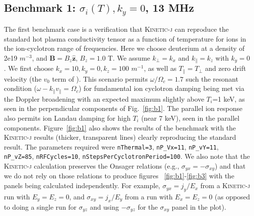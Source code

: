 \documentclass[final,5p,times,twocolumn]{elsarticle}
\let\oldhat\hat
\renewcommand{\vec}[1]{\mathbf{#1}}
\renewcommand{\hat}[1]{\oldhat{\mathbf{#1}}}
\newcommand{\kj}{\textsc{Kinetic-j}\xspace}
\begin{document}
\subsection{Benchmark 1: $\sigma_i\left(T\right), k_{y}=0$, 13 MHz}
\label{section:verification1}
%
The first benchmark case is a verification that \kj can reproduce the standard hot plasma conductivity tensor as a function of temperature for ions in the ion-cyclotron range of frequencies. Here we choose deuterium at a density of 2e19 $m^{-3}$, and $\vec{B}=B_z\hat{\vec{z}}$, $B_z=1.0$ T. We assume $k_\perp=k_x$ and $k_\parallel=k_z$ with $k_y=0$. We first choose $k_x=10,k_y=0,k_z=100$ $m^{-1}$, as well as $T_\parallel=T_\perp$ and zero drift velocity (the $v_0$ term of \cite{swanson}). This scenario permits $
\omega/\Omega_c=1.7$ such the resonant condition ($\omega-k_\parallel v_\parallel=\Omega_c$) for fundamental ion cyclotron damping being met via the Doppler broadening with an expected maximum slightly above $T_i$=1 keV, as seen in the perpendicular components of Fig.~\ref{fig:b1}. The parallel ion response also permits ion Landau damping for high $T_i$ (near 7 keV), seen in the parallel components. Figure~\ref{fig:b1} also shows the results of the benchmark with the \kj results (thicker, transparent lines) clearly reproducing the standard result. The parameters required were \texttt{nThermal=3}, \texttt{nP\_Vx=11}, \texttt{nP\_vY=11}, \texttt{nP\_vZ=85}, \texttt{nRFCycles=10}, \texttt{nStepsPerCyclotronPeriod=100}. We also note that the \kj calculation preserves the Onsager relations (e.g., $\sigma_{yx}=-\sigma_{xy}$) and that we do not rely on those relations to produce figures ~\ref{fig:b1}-\ref{fig:b3} with the panels being calculated independently. For example, $\sigma_{yx} = j_y / E_x$ from a \kj run with $E_y=E_z=0$, and $\sigma_{xy} = j_x / E_y$ from a run with $E_x=E_z=0$ (as opposed to doing a single run for $\sigma_{yz}$ and using $-\sigma_{yz}$ for the $\sigma_{xy}$ panel in the plot).
%
\end{document}
